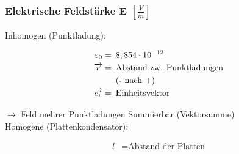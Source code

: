 \subsubsection*{Elektrische Feldstärke E $\left[\frac{V}{m}\right]$}
Inhomogen (Punktladung):

\vspace{-1mm}
\begin{minipage}{0.53\linewidth}
    \begin{footnotesize}
        \begin{center}
        \end{center}
    \end{footnotesize}
\end{minipage}
\vspace{1mm}
\begin{minipage}{0.46\linewidth}
    \begin{scriptsize}
        \begin{center}
            \begin{align*}
                \varepsilon_0 = &\enspace 8,854\cdot10^{-12}
                \\\overrightarrow{r} = &\text{\enspace Abstand zw. Punktladungen}
                \\&\text{\enspace(- nach +)}
                \\\overrightarrow{e_r} = &\text{\enspace Einheitsvektor}
            \end{align*}
        \end{center}
    \end{scriptsize}
\end{minipage}
\vspace{2mm}
$\longrightarrow$ Feld mehrer Punktladungen Summierbar (Vektorsumme)\\
Homogene (Plattenkondensator):

\begin{minipage}{0.53\linewidth}
    \begin{footnotesize}
        \begin{center}
        \end{center}
    \end{footnotesize}
\end{minipage}
\begin{minipage}{0.46\linewidth}
    \begin{scriptsize}
        \begin{center}
            \begin{align*}
                l &= \text{Abstand der Platten}
            \end{align*}
        \end{center}
    \end{scriptsize}
\end{minipage}
\vspace{1mm}